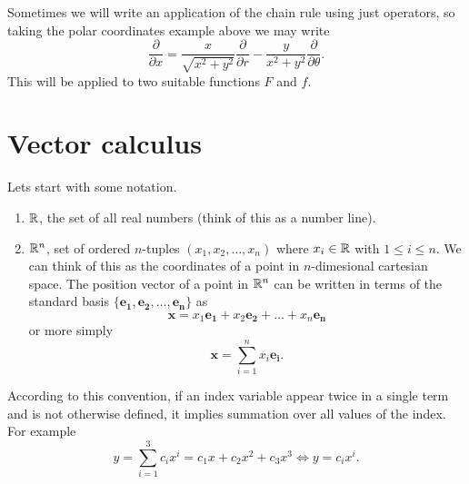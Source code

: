 Sometimes we will write an application of the chain rule using just operators, so taking the polar coordinates example above we may write \[ \frac{\partial}{\partial x} = \frac{x}{\sqrt{x^2 + y^2}} \frac{\partial}{\partial r} - \frac{y}{x^2 + y^2} \frac{\partial}{\partial \theta}. \] This will be applied to two suitable functions $F$ and $f$.

\chapter{Vector calculus}

Lets start with some notation.

\begin{enumerate}
    \item $\mathbb{R}$, the set of all real numbers (think of this as a number line).
    \item $\mathbb{R}^n$, set of ordered $n$-tuples $(x_1, x_2, \ldots, x_n)$ where $x_i \in \mathbb{R}$ with $1 \leq i \leq n$. We can think of this as the coordinates of a point in $n$-dimesional cartesian space. The position vector of a point in $\mathbb{R}^n$ can be written in terms of the standard basis $\{ \bm{e_1}, \bm{e_2}, \ldots, \bm{e_n}\}$ as \[ \bm x = x_1 \bm{e_1} + x_2 \bm{e_2} + \ldots + x_n \bm{e_n} \] or more simply \[ \bm x = \sum_{i = 1}^n x_i \bm{e_i}. \]
\end{enumerate}

\begin{remark}
    According to this convention, if an index variable appear twice in a single term and is not otherwise defined, it implies summation over all values of the index. For example \[ y = \sum_{i = 1}^{3} c_ix^i = c_1x + c_2x^2 + c_3x^3 \iff y = c_ix^i. \]
\end{remark}
